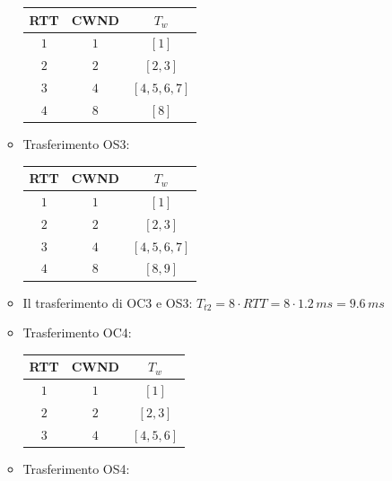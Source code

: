 \documentclass[10pt]{article}
\newcommand{\lightrule}{%
	\arrayrulecolor{black!30}%
	\midrule[\lightrulewidth]%
	\arrayrulecolor{black}}
\begin{document}
\begin{enumerate}
\begin{itemize}
			\begin{center}
				\centering
 				\begin{tabular}{@{} *{3}{c} @{}}
 				\toprule
 					\textbf{RTT} & \textbf{CWND} & \textbf{$T_w$} \\
 				\midrule
 					$1$ & $1$ & $[1]$ \\ 
				\lightrule
 					$2$ & $2$ & $[2,3]$ \\ 
 				\lightrule
 					$3$ & $4$ & $[4,5,6,7]$ \\ 
 				\lightrule
 					$4$ & $8$ & $[8]$ \\
				\bottomrule
				\end{tabular}
			\end{center}
			\item Trasferimento OS3:
			\begin{center}
				\centering
 				\begin{tabular}{@{} *{3}{c} @{}}
 				\toprule
 					\textbf{RTT} & \textbf{CWND} & \textbf{$T_w$} \\
 				\midrule
 					$1$ & $1$ & $[1]$ \\ 
				\lightrule
 					$2$ & $2$ & $[2,3]$ \\
				\lightrule
 					$3$ & $4$ & $[4,5,6,7]$ \\ 				
 				\lightrule
 					$4$ & $8$ & $[8,9]$ \\
				\bottomrule
				\end{tabular}
			\end{center}
			\item Il trasferimento di OC3 e OS3: $T_{t2} = 8 \cdot RTT = 8 \cdot 1.2 \,ms = 9.6 \,ms$
			\newpage
			\item Trasferimento OC4:
			\begin{center}
				\centering
 				\begin{tabular}{@{} *{3}{c} @{}}
 				\toprule
 					\textbf{RTT} & \textbf{CWND} & \textbf{$T_w$} \\
 				\midrule
 					$1$ & $1$ & $[1]$ \\ 
				\lightrule
 					$2$ & $2$ & $[2,3]$ \\  
 				\lightrule
 					$3$ & $4$ & $[4,5,6]$ \\
				\bottomrule
				\end{tabular}
			\end{center}
			\item Trasferimento OS4:
			\begin{center}
				\centering
 				\begin{tabular}{@{} *{3}{c} @{}}

\end{tabular}
\end{center}
\end{itemize}
\end{enumerate}
\end{document}
